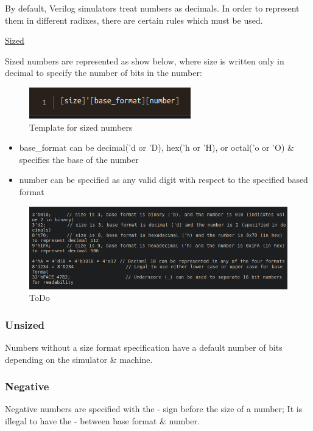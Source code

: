 \documentclass{article}
\begin{document}
	By default, Verilog simulators treat numbers as decimals. In order to represent them in different radixes, there are certain rules which must be used. \newline

	\underline{Sized}

	Sized numbers are represented as show below, where size is written only in decimal to specify the number of bits in the number:

	\begin{figure}[H]
		\includegraphics[width=\linewidth]{VerilogPics/figure_5.png}
		\caption{Template for sized numbers}
		\label{Template for sized numbers}
	\end{figure}

	\begin{itemize}
		\item base\_format can be decimal('d or 'D), hex('h or 'H), or octal('o or 'O) \& specifies the base of the number
		\item number can be specified as any valid digit with respect to the specified based format
	\end{itemize}

	\begin{figure}[H]
		\includegraphics[width=\linewidth]{VerilogPics/figure_6.png}
		\caption{ToDo}
		\label{ToDo}
	\end{figure}

	\subsubsection{Unsized}

	Numbers without a size format specification have a default number of bits depending on the simulator \& machine.

	\subsubsection{Negative} 
	Negative numbers are specified with the - sign before the size of a number; It is illegal to have the - between base format \& number.
\end{document}
